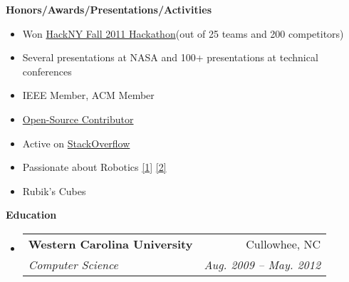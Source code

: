 \documentclass[letterpaper,8pt]{article}
\makeatletter
\newcommand{\resitem}[1]{\item #1 \vspace{-2pt}}
\newcommand{\resheading}[1]{{\large \colorbox{mygrey}{\begin{minipage}{\textwidth}{\textbf{#1 \vphantom{p\^{E}}}}\end{minipage}}}}
\newcommand{\ressubheading}[4]{
\begin{tabular*}{2.0in}{l@{\extracolsep{\fill}}r}
		\textbf{#1} & #2 \\
		\textit{#3} & \textit{#4} \\
\end{tabular*}\vspace{-6pt}}
\makeatother
\begin{document}
\resheading{Honors/Awards/Presentations/Activities}
\begin{itemize}
   \resitem{Won \href{http://www.youtube.com/watch?v=ga6RPRAFRUY}{HackNY Fall 2011 Hackathon}(out of 25 teams and 200 competitors)}
   \resitem{Several presentations at NASA and 100+ presentations at technical conferences}
   \resitem{IEEE Member, ACM Member}
   \resitem{\href{https://github.com/ranman}{Open-Source Contributor}}
   \resitem{Active on \href{http://stackoverflow.com/users/240004/ranman}{StackOverflow}}
   \resitem{Passionate about Robotics
      \href{http://robotics.punahou.edu/}{[1]}
      \href{http://irg.arc.nasa.gov}{[2]}}
   \resitem{Rubik's Cubes}
\end{itemize}
\resheading{Education}
\begin{itemize}
\item
   \ressubheading{Western Carolina University}{Cullowhee, NC}{Computer Science}{Aug. 2009 -- May. 2012}
\end{itemize}
\end{document}

